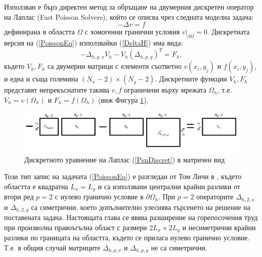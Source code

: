 \documentclass[a5paper]{article}
\newcommand{\be}{\begin{equation}}
\newcommand{\ee}{\end{equation}}
\newcommand{\rf}[1]{(\ref{#1})}
\theoremstyle{remark}
\begin{document}
\begin{normalsize}
Използван е бърз директен метод за обръщане на двумерния дискретен оператор на Лаплас (Fast Poisson Solvers), който се описва чрез следната моделна задача:
\be\label{PoissonEq}
-\Delta v = f
\ee
дефинирана в областта $\Omega$ с хомогенни гранични условия $v \big|_{\partial\Omega} = 0$. Дискретната версия на \rf{PoissonEq} използвайки \rf{DeltaH} има вида:
\be\label{PsnDiscret}
-\Delta_{h,p,x}  V_h - V_h (\Delta_{h,p,y})^T = F_h,
\ee
където $V_h, F_h$ са двумерни матрици с елементи съответно $v(x_i,y_j)$ и  $f(x_i,y_j)$, и една и съща големина $(N_x-2)\times(N_y-2)$. Дискретните функции $V_h, F_h$ представят непрекъснатите такива $v, f$ ограничени върху мрежата $\Omega_h$, т.е. $V_h = v(\Omega_h)$ и $F_h = f(\Omega_h)$ (виж Фигура \ref{fig:FPSexplained}).
\begin{figure}[ht]
     \includegraphics[width=\linewidth]{FPSExplained.png}
	\caption{Дискретното уравнение на Лаплас \rf{PsnDiscret} в матричен вид}
	\label{fig:FPSexplained}
\end{figure}
\FloatBarrier
Този тип запис на задачата \rf{PoissonEq} е разгледан от Том Личи в \cite{ref34}, където областта е квадратна $L_x = L_y$ и са използвани централни крайни разлики от втори ред $p=2$ с нулево гранично условие в $\partial \Omega_h$. При $p=2$ операторите $\Delta_{h,2,x}$ и $\Delta_{h,2,y}$ са симетрични, което допълнително улеснява търсенето на решение на поставената задача. Настоящата глава се явява разширение на горепосочения труд при произволна правоъгълна област с размери $2L_x \times 2L_y$ и несиметрични крайни разлики по границата на областта, където се прилага нулево гранично условие. Т.е. в общия случай матриците $\Delta_{h,p,x}$ и $\Delta_{h,p,y}$ не са симетрични.


\end{normalsize}
\end{document}
